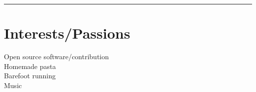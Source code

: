 \documentclass[letterpaper]{deedy-resume}
\begin{document}
\begin{minipage}[t]{0.3\textwidth}
{}


\sectionspace
\vspace{-1ex}
\rule{5cm}{0.5pt}

\vspace{2em}
\section{Interests/Passions}
\vspace{1em}
\textbullet{} Open source software/contribution\\
\textbullet{} Homemade pasta\\
\textbullet{} Barefoot running\\
\textbullet{} Music\\

\end{minipage} %
\hfill
\vrule
\hspace{3ex}
%
%
\end{document}
